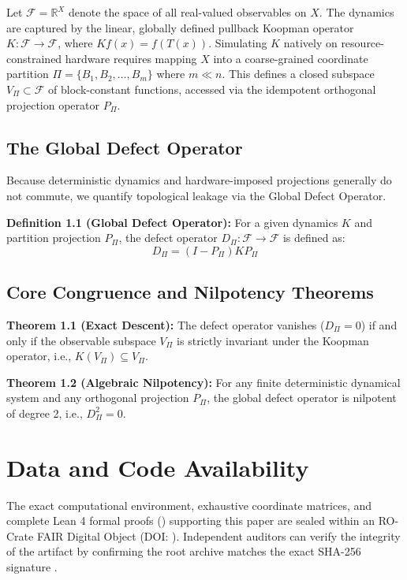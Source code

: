 \documentclass[10pt, conference]{IEEEtran}
\begin{document}
Let $\mathcal{F} = \mathbb{R}^X$ denote the space of all real-valued observables on $X$. The dynamics are captured by the linear, globally defined pullback Koopman operator $K: \mathcal{F} \to \mathcal{F}$, where $Kf(x) = f(T(x))$. Simulating $K$ natively on resource-constrained hardware requires mapping $X$ into a coarse-grained coordinate partition $\Pi = \{B_1, B_2, \dots, B_m\}$ where $m \ll n$. This defines a closed subspace $V_\Pi \subset \mathcal{F}$ of block-constant functions, accessed via the idempotent orthogonal projection operator $P_\Pi$.

\subsection{The Global Defect Operator}
Because deterministic dynamics and hardware-imposed projections generally do not commute, we quantify topological leakage via the Global Defect Operator.

\textbf{Definition 1.1 (Global Defect Operator):} For a given dynamics $K$ and partition projection $P_\Pi$, the defect operator $D_\Pi: \mathcal{F} \to \mathcal{F}$ is defined as:
$$D_\Pi = (I - P_\Pi) K P_\Pi$$

\subsection{Core Congruence and Nilpotency Theorems}
\textbf{Theorem 1.1 (Exact Descent):} The defect operator vanishes ($D_\Pi = 0$) if and only if the observable subspace $V_\Pi$ is strictly invariant under the Koopman operator, i.e., $K(V_\Pi) \subseteq V_\Pi$.

\textbf{Theorem 1.2 (Algebraic Nilpotency):} For any finite deterministic dynamical system and any orthogonal projection $P_\Pi$, the global defect operator is nilpotent of degree 2, i.e., $D_\Pi^2 = 0$.

\section{Data and Code Availability}
The exact computational environment, exhaustive coordinate matrices, and complete Lean 4 formal proofs (\aqarionLeanStatus) supporting this paper are sealed within an RO-Crate FAIR Digital Object (DOI: \href{https://doi.org/\aqarionDOI}{\aqarionDOI}). Independent auditors can verify the integrity of the artifact by confirming the root archive matches the exact SHA-256 signature \texttt{\aqarionHash}.
\end{document}
